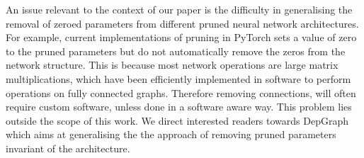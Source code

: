 An issue relevant to the context of our paper is the difficulty in generalising the removal of zeroed parameters from different pruned neural network architectures. For example, current implementations of pruning in PyTorch sets a value of zero to the pruned parameters but do not automatically remove the zeros from the network structure. 
%
%
This is because most network operations are large matrix multiplications, which have been efficiently implemented in software to perform operations on fully connected graphs. Therefore removing connections, will often require custom software, unless done in a software aware way. This problem lies outside the scope of this work.  
%
We direct interested readers towards DepGraph~\cite{fang2023depgraph} which aims at generalising the the approach of removing pruned parameters invariant of the architecture. 
%


%





